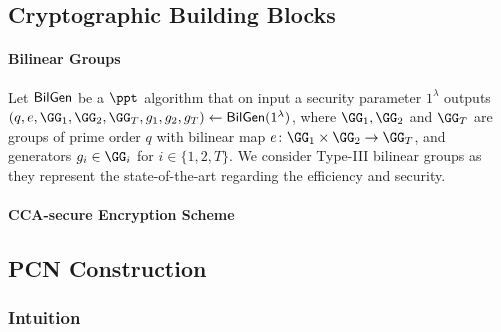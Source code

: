 
\subsection{Cryptographic Building Blocks}

\paragraph{Bilinear Groups} Let $\mathsf{BilGen}$ be a $\ppt$ algorithm that on input a security 
parameter $1^\lambda$ outputs $(q, e, \GG_1, \GG_2, \GG_T, g_1, g_2, g_T) \gets 
\BilGen(1^\lambda)$, where $\GG_1, \GG_2$ and $\GG_T$ are groups of prime order $q$ with 
bilinear map $e \colon \GG_1 \times \GG_2 \to \GG_T$, and generators $g_i \in \GG_i$ for $i \in 
\{1,2,T\}$. We consider Type-III bilinear groups as they represent the state-of-the-art regarding 
the efficiency and security.

\paragraph{CCA-secure Encryption Scheme} 

\subsection{PCN Construction}

\subsubsection{Intuition}

